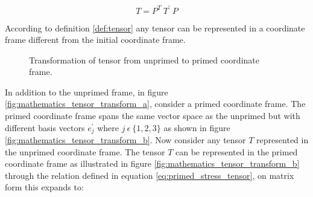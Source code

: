 \begin{equation}
T = P^T \ T^\prime \ P
\end{equation}

According to definition \vref{def:tensor} any tensor can be
represented in a coordinate frame different from the initial
coordinate frame. 

\begin{figure}
  \centering
  \caption{Transformation of tensor from unprimed to primed coordinate
  frame.}
  \label{fig:tensor_transformation}
\end{figure}


In addition to the unprimed frame, in figure
\vref{fig:mathematics_tensor_transform_a}, consider a primed
coordinate frame. The primed 
coordinate frame spans the same vector space as the unprimed but with
different basis vectors $e^\prime_j$ where $j \ \epsilon \ \lbrace 1,2,3 \rbrace$ as shown in
figure \vref{fig:mathematics_tensor_transform_b}. Now consider any
tensor $T$ represented in the unprimed coordinate frame. The tensor
$T$ can be represented in the primed coordinate frame as
illustrated in figure
\vref{fig:mathematics_tensor_transform_b} through the
relation defined in equation \eqref{eq:primed_stress_tensor},
on matrix form this expands to:

